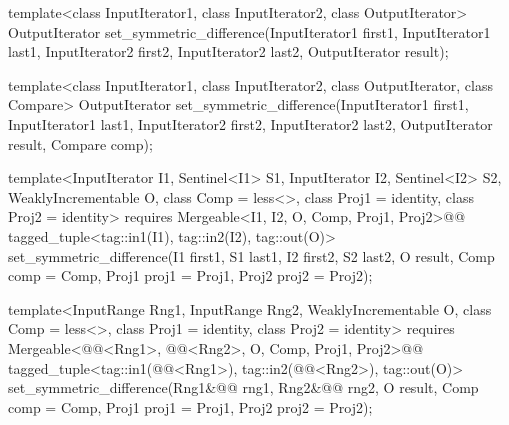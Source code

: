 %
\begin{removedblock}
\begin{itemdecl}
template<class InputIterator1, class InputIterator2,
         class OutputIterator>
  OutputIterator
    set_symmetric_difference(InputIterator1 first1, InputIterator1 last1,
                             InputIterator2 first2, InputIterator2 last2,
                             OutputIterator result);

template<class InputIterator1, class InputIterator2,
         class OutputIterator, class Compare>
  OutputIterator
    set_symmetric_difference(InputIterator1 first1, InputIterator1 last1,
                             InputIterator2 first2, InputIterator2 last2,
                             OutputIterator result, Compare comp);
\end{itemdecl}
\end{removedblock}
\begin{addedblock}
\begin{itemdecl}
template<InputIterator I1, Sentinel<I1> S1, InputIterator I2, Sentinel<I2> S2,
    WeaklyIncrementable O, class Comp = less<>, class Proj1 = identity, class Proj2 = identity>
  requires Mergeable<I1, I2, O, Comp, Proj1, Proj2>@\newtxt{()}@
  tagged_tuple<tag::in1(I1), tag::in2(I2), tag::out(O)>
    set_symmetric_difference(I1 first1, S1 last1, I2 first2, S2 last2, O result,
                             Comp comp = Comp{}, Proj1 proj1 = Proj1{},
                             Proj2 proj2 = Proj2{});

template<InputRange Rng1, InputRange Rng2, WeaklyIncrementable O,
    class Comp = less<>, class Proj1 = identity, class Proj2 = identity>
  requires Mergeable<@@<Rng1>, @@<Rng2>, O, Comp, Proj1, Proj2>@\newtxt{()}@
  tagged_tuple<tag::in1(@@<Rng1>),
               tag::in2(@@<Rng2>),
               tag::out(O)>
    set_symmetric_difference(Rng1&@\newtxt{\&}@ rng1, Rng2&@\newtxt{\&}@ rng2, O result, Comp comp = Comp{},
                             Proj1 proj1 = Proj1{}, Proj2 proj2 = Proj2{});
\end{itemdecl}
\end{addedblock}

